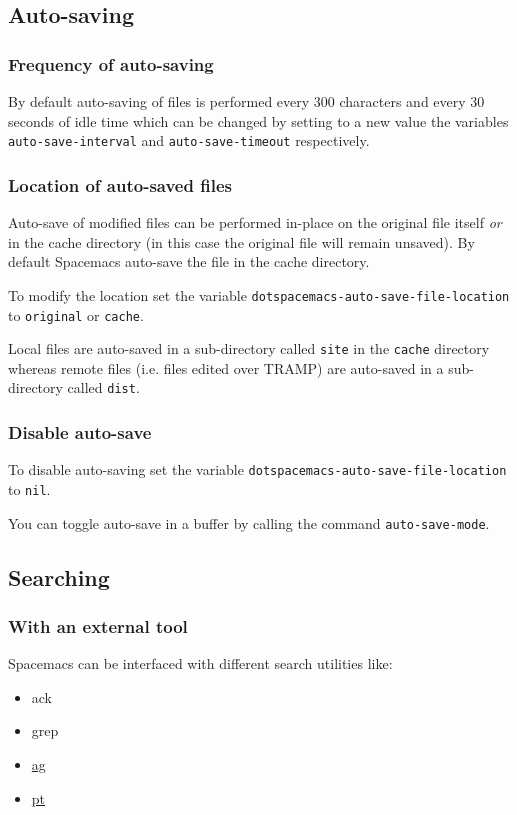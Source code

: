 \documentclass[11pt]{article}
\begin{document}
\subsection{Auto-saving}
\label{sec:org85dfa0c}
\subsubsection{Frequency of auto-saving}
\label{sec:orgc96868a}
By default auto-saving of files is performed every 300 characters and
every 30 seconds of idle time which can be changed by setting to a
new value the variables \texttt{auto-save-interval} and \texttt{auto-save-timeout}
respectively.

\subsubsection{Location of auto-saved files}
\label{sec:org6ba0e03}
Auto-save of modified files can be performed in-place on the original file
itself \emph{or} in the cache directory (in this case the original file will remain
unsaved). By default Spacemacs auto-save the file in the cache directory.

To modify the location set the variable \texttt{dotspacemacs-auto-save-file-location}
to \texttt{original} or \texttt{cache}.

Local files are auto-saved in a sub-directory called \texttt{site} in the \texttt{cache}
directory whereas remote files (i.e. files edited over TRAMP) are auto-saved
in a sub-directory called \texttt{dist}.

\subsubsection{Disable auto-save}
\label{sec:orgcf01f51}
To disable auto-saving set the variable \texttt{dotspacemacs-auto-save-file-location}
to \texttt{nil}.

You can toggle auto-save in a buffer by calling the command \texttt{auto-save-mode}.

\subsection{Searching}
\label{sec:org63f2b47}
\subsubsection{With an external tool}
\label{sec:orge8a60e6}
Spacemacs can be interfaced with different search utilities like:
\begin{itemize}
\item ack
\item grep
\item \href{https://github.com/ggreer/the\_silver\_searcher}{ag}
\item \href{https://github.com/monochromegane/the\_platinum\_searcher}{pt}
\end{itemize}
\end{document}
